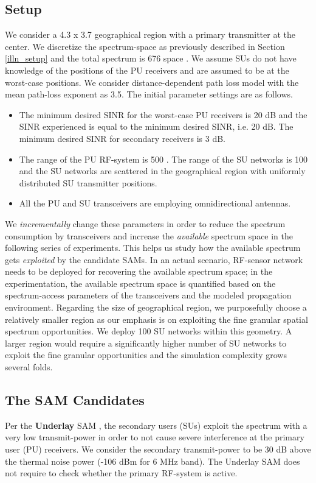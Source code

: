 \documentclass[12pt, draftclsnofoot, onecolumn]{IEEEtran}
\begin{document}
\subsection{Setup}
We consider a 4.3  x 3.7  geographical region with a primary transmitter at the center. We discretize the spectrum-space as previously described in Section \ref{illn_setup} and the total spectrum is 676 space . We assume SUs do not have knowledge of the positions of the PU receivers and  are assumed to be at the worst-case positions. We consider distance-dependent path loss model with the mean path-loss exponent as 3.5. The initial parameter settings are as follows.
\begin{itemize}
	\item The minimum desired SINR for the worst-case PU receivers is 20 dB and the SINR experienced is equal to the minimum desired SINR, i.e. 20 dB. The  minimum desired SINR for secondary receivers is 3 dB.
	\item The range of the PU RF-system is 500 . The range of the SU networks is 100  and the SU networks are scattered in the geographical region with uniformly distributed SU transmitter positions. 
	\item All the PU and SU transceivers are employing omnidirectional antennas.  
\end{itemize}
We \textit{incrementally} change these parameters in order to reduce the spectrum consumption  by transceivers and increase the \textit{available} spectrum space in the following series of experiments.  This helps us study how the available spectrum gets \textit{exploited} by the candidate SAMs. In an actual scenario, RF-sensor network needs to be deployed for recovering the available spectrum space; in the experimentation, the available spectrum space is quantified based on the spectrum-access parameters of the transceivers and the modeled propagation environment. Regarding the size of geographical region, we purposefully choose a relatively smaller region as our emphasis is on exploiting the fine granular spatial spectrum opportunities. We deploy 100 SU networks within this geometry. A larger region would require a significantly higher number of SU networks to exploit the fine granular opportunities and the simulation complexity grows several folds. 

\subsection{The SAM Candidates}
Per the \textbf{Underlay} SAM \cite{dsa_survey}, the secondary users (SUs) exploit the spectrum with a very low transmit-power in order to not cause severe interference at the primary user (PU) receivers. We consider the secondary transmit-power to be 30 dB above the thermal noise power (-106 dBm for 6 MHz band). The Underlay SAM does not require to check whether the primary RF-system is active.
\end{document}
